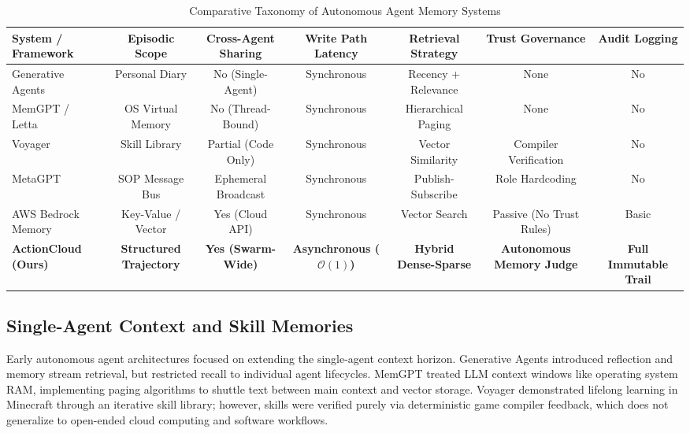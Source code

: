 \documentclass[lettersize,journal]{IEEEtran}
\begin{document}
\begin{table}[!t]
\centering
\caption{Comparative Taxonomy of Autonomous Agent Memory Systems}
\label{tab:related_work}
\setlength{\tabcolsep}{4pt}
\renewcommand{\arraystretch}{1.2}
\begin{tabular}{lcccccc}
\toprule
\textbf{System / Framework} & \textbf{Episodic Scope} & \textbf{Cross-Agent Sharing} & \textbf{Write Path Latency} & \textbf{Retrieval Strategy} & \textbf{Trust Governance} & \textbf{Audit Logging} \\
\midrule
Generative Agents \cite{park2023generative} & Personal Diary & No (Single-Agent) & Synchronous & Recency + Relevance & None & No \\
MemGPT / Letta \cite{packer2023memgpt} & OS Virtual Memory & No (Thread-Bound) & Synchronous & Hierarchical Paging & None & No \\
Voyager \cite{wang2023voyager} & Skill Library & Partial (Code Only) & Synchronous & Vector Similarity & Compiler Verification & No \\
MetaGPT \cite{hong2023metagpt} & SOP Message Bus & Ephemeral Broadcast & Synchronous & Publish-Subscribe & Role Hardcoding & No \\
AWS Bedrock Memory \cite{aws2024bedrock} & Key-Value / Vector & Yes (Cloud API) & Synchronous & Vector Search & Passive (No Trust Rules) & Basic \\
\rowcolor{blue!8}
\textbf{ActionCloud (Ours)} & \textbf{Structured Trajectory} & \textbf{Yes (Swarm-Wide)} & \textbf{Asynchronous ($\mathcal{O}(1)$)} & \textbf{Hybrid Dense-Sparse} & \textbf{Autonomous Memory Judge} & \textbf{Full Immutable Trail} \\
\bottomrule
\end{tabular}
\end{table}

\subsection{Single-Agent Context and Skill Memories}
Early autonomous agent architectures focused on extending the single-agent context horizon. Generative Agents \cite{park2023generative} introduced reflection and memory stream retrieval, but restricted recall to individual agent lifecycles. MemGPT \cite{packer2023memgpt} treated LLM context windows like operating system RAM, implementing paging algorithms to shuttle text between main context and vector storage. Voyager \cite{wang2023voyager} demonstrated lifelong learning in Minecraft through an iterative skill library; however, skills were verified purely via deterministic game compiler feedback, which does not generalize to open-ended cloud computing and software workflows.
\end{document}
